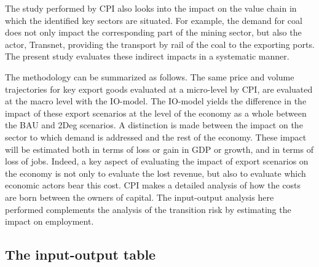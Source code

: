 \documentclass[12pt,english]{article}
\begin{document}
The study performed by CPI also looks into the impact on the value chain in which the identified key sectors are situated. For example, the demand for coal does not only impact the corresponding part of the mining sector, but also the actor, Transnet, providing the transport by rail of the coal to the exporting ports. The present study evaluates these indirect impacts in a systematic manner.

The methodology can be summarized as follows. The same price and volume trajectories for key export goods %
evaluated at a micro-level by CPI, are evaluated at the macro level with the IO-model. The IO-model yields the difference in the impact of these export scenarios at the level of the economy as a whole between the BAU and 2Deg scenarios. A distinction is made between the impact on the sector to which demand is addressed and the rest of the economy. %
These impact will be estimated both in terms of loss or gain in GDP or growth, and in terms of loss of jobs. Indeed, a key aspect of evaluating the impact of export scenarios on the economy is not only to evaluate the lost revenue, but also to evaluate which economic actors bear this cost. CPI makes a detailed analysis of how the costs are born between the owners of capital. %
The input-output analysis here performed complements the analysis of the transition risk by estimating the impact on employment. 




\subsection{The input-output table}
\end{document}
